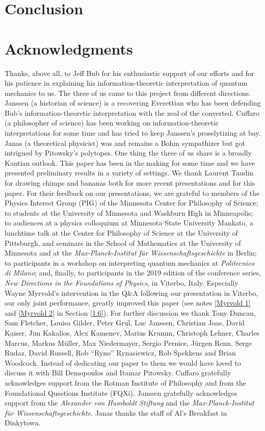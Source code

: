 \documentclass[12pt]{article}
\numberwithin{equation}{section}
\begin{document}
\section{Conclusion} \label{5}



\section*{Acknowledgments}

Thanks, above all, to Jeff Bub for his enthusiastic support of our efforts and for his patience in explaining his information-theoretic interpretation of quantum mechanics to us. The three of us came to this project from different directions. Janssen (a historian of science) is a recovering Everettian who has been defending Bub's information-theoretic interpretation with the zeal of the converted. Cuffaro (a philosopher of science) has been working on information-theoretic interpretations for some time and has tried to keep Janssen's proselytizing at bay. Janas (a theoretical physicist) was and remains a Bohm sympathizer but got intrigued by Pitowsky's polytopes. One thing the three of us share is a broadly Kantian outlook. This paper has been in the making for some time and we have presented preliminary results in a variety of settings. We thank Laurent Taudin for drawing chimps and bananas both for more recent presentations and for this paper. For their feedback on our presentations, we are grateful to members of the Physics Interest Group (PIG) of the Minnesota Center for Philosophy of Science; to students at the University of Minnesota and Washburn High in Minneapolis; to audiences at a physics colloquium at Minnesota State University Mankato, a lunchtime talk at the Center for Philosophy of Science at the University of Pittsburgh, and seminars in the School of Mathematics at the University of Minnesota and at the \emph{Max-Planck-Institut f\"ur Wissenschaftsgeschichte} in Berlin; to participants in a workshop on interpreting quantum mechanics at \emph{Politecnico di Milano}; and, finally, to participants in the 2019 edition of the conference series, \emph{New Directions in the Foundations of Physics}, in Viterbo, Italy. Especially Wayne Myrvold's intervention in the Q\&A following our presentation in Viterbo, our only joint performance, greatly improved this paper (see notes \ref{Myrvold 1} and \ref{Myrvold 2} in Section \ref{1.6}). For further discussion we thank Tony Duncan, Sam Fletcher, Louisa Gilder, Peter Grul, Luc Janssen, Christian Joas, David Kaiser, Jim Kakalios, Alex Kamenev, Marius Krumm, Christoph Lehner, Charles Marcus, Markus M\"uller, Max Niedermayer, Sergio Pernice, J\"urgen Renn, Serge Rudaz, David Russell, Rob ``Ryno'' Rynasiewicz, Rob Spekkens and Brian Woodcock.  Instead of dedicating our paper to them we would have loved to discuss it with Bill Demopoulos and Itamar Pitowsky. Cuffaro gratefully acknowledges support from the Rotman Institute of Philosophy and from the Foundational Questions Institute (FQXi). Janssen gratefully acknowledges support from the \emph{Alexander von Humboldt Stiftung} and the \emph{Max-Planck-Institut f\"ur Wissenschaftsgeschichte}. Janas thanks the staff of Al's Breakfast in Dinkytown.
\end{document}
